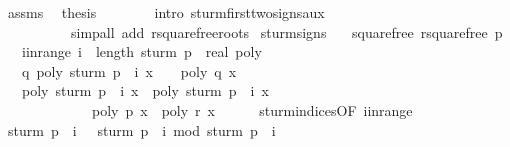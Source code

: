 \begin{isabellebody}
\ assms\ \isamarkupfalse%
\ {\isacharquery}thesis\isanewline
\ \ \ \ \ \ \isamarkupfalse%
\ {\isacharparenleft}intro\ sturm{\isacharunderscore}firsttwo{\isacharunderscore}signs{\isacharunderscore}aux{\isacharcomma}\ \isanewline
\ \ \ \ \ \ \ \ \ \ simp{\isacharunderscore}all\ add{\isacharcolon}\ rsquarefree{\isacharunderscore}roots{\isacharparenright}\isanewline
{}\isamarkupfalse%
%
\endisatagproof
{\isafoldproof}%
%
\isadelimproof
\isanewline
%
\endisadelimproof
\isanewline
\isanewline
{}\isamarkupfalse%
\ sturm{\isacharunderscore}signs{\isacharcolon}\isanewline
\ \ \ squarefree{\isacharcolon}\ {\isachardoublequoteopen}rsquarefree\ p{\isachardoublequoteclose}\isanewline
\ \ \ i{\isacharunderscore}in{\isacharunderscore}range{\isacharcolon}\ {\isachardoublequoteopen}i\ {\isacharless}\ length\ {\isacharparenleft}sturm\ {\isacharparenleft}p\ {\isacharcolon}{\isacharcolon}\ real\ poly{\isacharparenright}{\isacharparenright}\ {\isacharminus}\ {}{\isachardoublequoteclose}\ \isanewline
\ \ \ q{\isacharunderscore}{}{\isacharcolon}\ {\isachardoublequoteopen}poly\ {\isacharparenleft}sturm\ p\ {\isacharbang}\ {\isacharparenleft}i{\isacharplus}{}{\isacharparenright}{\isacharparenright}\ x\ {\isacharequal}\ {}{\isachardoublequoteclose}\ {\isacharparenleft}\ {\isachardoublequoteopen}poly\ {\isacharquery}q\ x\ {\isacharequal}\ {}{\isachardoublequoteclose}{\isacharparenright}\isanewline
\ \ \ {\isachardoublequoteopen}poly\ {\isacharparenleft}sturm\ p\ {\isacharbang}\ {\isacharparenleft}i{\isacharplus}{}{\isacharparenright}{\isacharparenright}\ x\ {\isacharasterisk}\ poly\ {\isacharparenleft}sturm\ p\ {\isacharbang}\ i{\isacharparenright}\ x\ {\isacharless}\ {}{\isachardoublequoteclose}\isanewline
\ \ \ \ \ \ \ \ \ \ \ \ {\isacharparenleft}\ {\isachardoublequoteopen}poly\ {\isacharquery}p\ x\ {\isacharasterisk}\ poly\ {\isacharquery}r\ x\ {\isacharless}\ {}{\isachardoublequoteclose}{\isacharparenright}\isanewline
%
\isadelimproof
%
\endisadelimproof
%
\isatagproof
{}\isamarkupfalse%
{\isacharminus}\isanewline
\ \ \isamarkupfalse%
\ sturm{\isacharunderscore}indices{\isacharbrackleft}OF\ i{\isacharunderscore}in{\isacharunderscore}range{\isacharbrackright}\ \isanewline
\ \ \ \ \ \ \isamarkupfalse%
\ {\isachardoublequoteopen}sturm\ p\ {\isacharbang}\ {\isacharparenleft}i{\isacharplus}{}{\isacharparenright}\ {\isacharequal}\ {\isacharminus}\ {\isacharparenleft}sturm\ p\ {\isacharbang}\ i\ mod\ sturm\ p\ {\isacharbang}\ {\isacharparenleft}i{\isacharplus}{}{\isacharparenright}{\isacharparenright}{\isachardoublequoteclose}\isanewline

\end{isabellebody}
